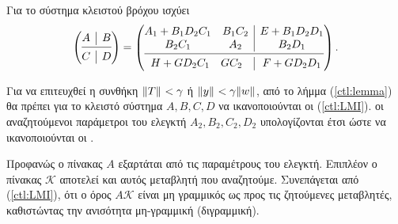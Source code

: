 Για το σύστημα κλειστού βρόχου ισχύει
\begin{equation*}
    \begin{pmatrix}
        \begin{array}{@{}c|c@{}}
            A & 
            B \\
            \cmidrule[0.4pt]{1-2}
            C & 
            D \\
        \end{array} 
    \end{pmatrix} = 
    \begin{pmatrix}
        \begin{array}{@{}c|c@{}}
            \begin{matrix}
                A_1 + B_1 D_2 C_1 & B_1 C_2\\
                B_2 C_1           & A_2
            \end{matrix} & 
            \begin{matrix}
                E + B_1 D_2 D_1\\
                B_2 D_1
            \end{matrix} \\
            \cmidrule[0.4pt]{1-2}
            \begin{matrix}
                H + G D_2 C_1 & G C_2
            \end{matrix} & 
            \begin{matrix}
                F + G D_2 D_1
            \end{matrix} \\
        \end{array} 
    \end{pmatrix}.
\end{equation*}

Για να επιτευχθεί η συνθήκη $\|T\|_{}< \gamma$ ή $\|y\|_{} < \gamma \|w\|_{}$, 
από το λήμμα (\ref{ctl:lemma}) θα πρέπει για το κλειστό σύστημα $A, B, C, D$ να 
ικανοποιούνται οι  (\ref{ctl:LMI}). οι αναζητούμενοι παράμετροι του 
ελεγκτή $A_2, B_2, C_2, D_2$ υπολογίζονται έτσι ώστε να ικανοποιούνται οι 
.

Προφανώς ο πίνακας $A$ εξαρτάται από τις παραμέτρους του ελεγκτή. Επιπλέον ο 
πίνακας $\mathcal{K}$ αποτελεί και αυτός μεταβλητή που αναζητούμε. Συνεπάγεται 
από (\ref{ctl:LMI}), ότι ο όρος $A \mathcal{K}$ είναι μη γραμμικός ως προς τις 
ζητούμενες μεταβλητές, καθιστώντας την ανισότητα μη-γραμμική (διγραμμική).

